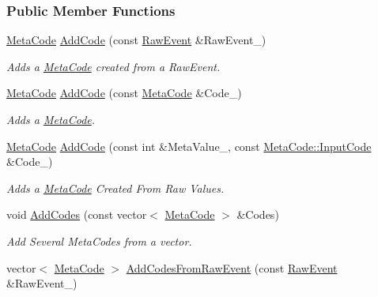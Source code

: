 \subsubsection*{Public Member Functions}
\begin{DoxyCompactItemize}
\item 
\hyperlink{classMezzanine_1_1MetaCode}{MetaCode} \hyperlink{classMezzanine_1_1EventUserInput_a8a4eaa043a7e88ced6a0cb4e5d817291}{AddCode} (const \hyperlink{namespaceMezzanine_ae8d4c0ab783af89a250b0225b75753e5}{RawEvent} \&RawEvent\_\-)
\begin{DoxyCompactList}\small\item\em Adds a \hyperlink{classMezzanine_1_1MetaCode}{MetaCode} created from a RawEvent. \item\end{DoxyCompactList}\item 
\hyperlink{classMezzanine_1_1MetaCode}{MetaCode} \hyperlink{classMezzanine_1_1EventUserInput_aa2021a2bec834207a78bad0338714d83}{AddCode} (const \hyperlink{classMezzanine_1_1MetaCode}{MetaCode} \&Code\_\-)
\begin{DoxyCompactList}\small\item\em Adds a \hyperlink{classMezzanine_1_1MetaCode}{MetaCode}. \item\end{DoxyCompactList}\item 
\hyperlink{classMezzanine_1_1MetaCode}{MetaCode} \hyperlink{classMezzanine_1_1EventUserInput_aaf966edbc281d55457e86e2039e87dd7}{AddCode} (const int \&MetaValue\_\-, const \hyperlink{classMezzanine_1_1MetaCode_a3b5633f0145bf3287cf53a3f05b5563c}{MetaCode::InputCode} \&Code\_\-)
\begin{DoxyCompactList}\small\item\em Adds a \hyperlink{classMezzanine_1_1MetaCode}{MetaCode} Created From Raw Values. \item\end{DoxyCompactList}\item 
void \hyperlink{classMezzanine_1_1EventUserInput_ab6ed3c37497ddc7f1985e7ae216ea774}{AddCodes} (const vector$<$ \hyperlink{classMezzanine_1_1MetaCode}{MetaCode} $>$ \&Codes)
\begin{DoxyCompactList}\small\item\em Add Several MetaCodes from a vector. \item\end{DoxyCompactList}\item 
vector$<$ \hyperlink{classMezzanine_1_1MetaCode}{MetaCode} $>$ \hyperlink{classMezzanine_1_1EventUserInput_ac24aaefbb290b4452886ba3f616f0d94}{AddCodesFromRawEvent} (const \hyperlink{namespaceMezzanine_ae8d4c0ab783af89a250b0225b75753e5}{RawEvent} \&RawEvent\_\-)

\end{DoxyCompactItemize}
